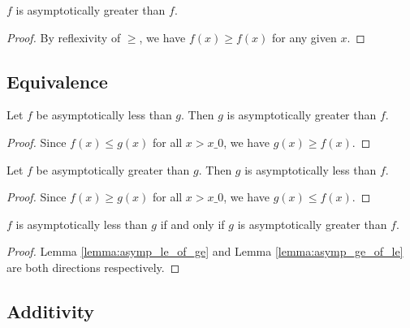 \begin{lemma}
    \label{lemma:asymp_ge_refl}
    \leanok
    $f$ is asymptotically greater than $f$.
\end{lemma}

\begin{proof}
    \leanok
    By reflexivity of $\ge$, we have $f(x) \ge f(x)$ for any given $x$.
\end{proof}


\subsection{Equivalence}

\begin{lemma}
    \label{lemma:asymp_le_of_ge}
    \leanok
    Let $f$ be asymptotically less than $g$. Then $g$ is asymptotically
    greater than $f$.
\end{lemma}

\begin{proof}
    \leanok
    Since $f(x) \le g(x)$ for all $x > x\_0$, we have $g(x) \ge f(x)$.
\end{proof}

\begin{lemma}
    \label{lemma:asymp_ge_of_le}
    \leanok
    Let $f$ be asymptotically greater than $g$. Then $g$ is asymptotically
    less than $f$.
\end{lemma}

\begin{proof}
    \leanok
    Since $f(x) \ge g(x)$ for all $x > x\_0$, we have $g(x) \le f(x)$.
\end{proof}

\begin{theorem}
    \label{thm:asymp_le_ge_iff}
    \leanok
    $f$ is asymptotically less than $g$ if and only if $g$ is asymptotically
    greater than $f$.
\end{theorem}

\begin{proof}
    \leanok
    Lemma \ref{lemma:asymp_le_of_ge} and Lemma \ref{lemma:asymp_ge_of_le} are both directions
    respectively.
\end{proof}


\subsection{Additivity}

